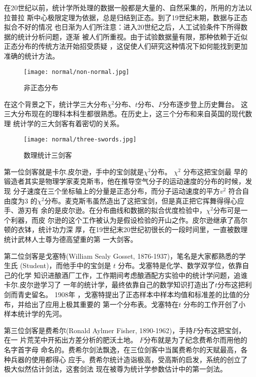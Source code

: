 在20世纪以前，统计学所处理的数据一般都是大量的、自然采集的，所用的方法以拉普拉
斯中心极限定理为依据，总是归结到正态。到了19世纪末期，数据与正态拟合不好的情况
也日渐为人们所注意：进入20世纪之后，人工试验条件下所得数据的统计分析问题，逐渐
被人们所重视。由于试验数据量有限，那种依赖于近似正态分布的传统方法开始招受质疑
，这促使人们研究这种情况下如何能找到更加准确的统计方法。

\begin{figure}[ht]
\centering
\texttt{[image: normal/non-normal.jpg]}
\caption{非正态分布}
\end{figure}

在这个背景之下，统计学三大分布$\chi^2$分布、$t$分布、$F$分布逐步登上历史舞台。
这三大分布现在的理科本科生都很熟悉。在历史上，这三个分布和来自英国的现代数理
统计学的三大剑客有着密切的关系。

\begin{figure}[ht]
\centering
\texttt{[image: normal/three-swords.jpg]}
\caption{数理统计三剑客}
\end{figure}

第一位剑客就是卡尔.皮尔逊，手中的宝剑就是$\chi^2$分布。 $\chi^2$ 分布这把宝剑最
早的锻造者其实是物理学家麦克斯韦，他在推导空气分子的运动速度的分布的时候，发现
分子速度在三个坐标轴上的分量是正态分布，而分子运动速度的平方$v^2$ 符合自由度为3
的$\chi^2$分布。麦克斯韦虽然造出了这把宝剑，但是真正把它挥舞得得心应手、游刃有
余的是皮尔逊。在分布曲线和数据的拟合优度检验中，$\chi^2$分布可是一个利器，而皮
尔逊的这个工作被认为是假设检验的开山之作。皮尔逊继承了高尔顿的衣钵，统计功力深
厚，在19世纪末20世纪初很长的一段时间里，一直被数理统计武林人士尊为德高望重的第
一大剑客。

第二位剑客是戈塞特(William Sealy Gosset, 1876-1937)，笔名是大家都熟悉的学生氏
(Student)，而他手中的宝剑是 $t$ 分布。戈塞特是化学、数学双学位，依靠自己的化学
知识进酿酒厂工作，工作期间考虑酿酒配方实验中的统计学问题，追谁卡尔.皮尔逊学习了
一年的统计学，最终依靠自己的数学知识打造出了$t$分布这把利剑而青史留名。 1908年
，戈塞特提出了正态样本中样本均值和标准差的比值的分布，并给出了应用上极其重要的
第一个分布表。戈塞特在$t$ 分布的工作开创了小样本统计学的先河。

第三位剑客是费希尔(Ronald Aylmer Fisher, 1890-1962)，手持$F$分布这把宝剑，在一
片荒芜中开拓出方差分析的肥沃土地。 $F$分布就是为了纪念费希尔而用他的名字首字母
命名的。费希尔剑法飘逸，在三位剑客中当属费希尔的天赋最高，各种兵器的使用都得心
应手。费希尔统计造诣极高，受高斯的启发，系统的创立了极大似然估计剑法，这套剑法
现在被尊为统计学参数估计中的第一剑法。

